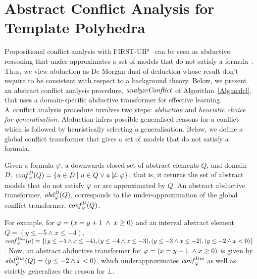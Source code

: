\section{Abstract Conflict Analysis for Template Polyhedra}\label{sec:conflict}
%
Propositional conflict analysis with FIRST-UIP~\cite{cdcl} can be seen as
abductive reasoning that under-approximates a set of models that do not
satisfy a formula~\cite{sas12,dhk2013-popl}.  Thus, we view abduction as 
De Morgan dual of deduction whose result don't require to be consistent with respect
to a background theory.  Below, we present an abstract
conflict analysis procedure, $\mathit{analyzeConflict}$ of
Algorithm~\ref{Alg:acdcl}, that uses a domain-specific abductive transformer
for effective learning.  A~conflict analysis procedure involves two steps:
{\em abduction} and {\em heuristic choice for generalisation}.  Abduction
infers possible generalised reasons for a conflict which is followed by
heuristically selecting a generalisation.  Below, we define a global 
conflict transformer that gives a set of models that do not satisfy a 
formula.  
\begin{definition}
  Given a formula $\varphi$, a downwards closed set of abstract elements $Q$,
  and domain $\mathit{D}$, $\mathit{conf}_{\varphi}^{\mathit{D}}(Q) = \{u \in \mathit{D} \mid u \in
  Q \vee u \not\models \varphi \}$, that is, it returns 
  the set of abstract models that do not satisfy $\varphi$ or are approximated by 
  $Q$.  An abstract abductive transformer, $\mathit{abd}_{\varphi}^{\mathit{D}}(Q)$, corresponds to 
  the under-approximation of the global conflict transformer,
  $\mathit{conf}_{\varphi}^{\mathit{D}}(Q)$.  
\end{definition}
%
%
For example, for $\varphi=(x=y+1\; \wedge\; x\geq 0)$ and an interval 
abstract element $Q=(y\leq-5 \wedge x \leq -4)$, 
$\mathit{conf}_{\varphi}^{\mathit{Itvs}}(a) = \{(y\leq-5 \land x \leq -4),\allowbreak
(y \leq -4 \land x \leq -3),\allowbreak
(y \leq -3 \land x \leq -2), (y \leq -2 \land x < 0)\}$.  
%
Now, an abstract abductive transformer for $\varphi=(x=y+1\; \wedge x \geq 0)$ 
is given by $\mathit{abd}_{\varphi}^{\mathit{Itvs}}(Q)=(y \leq -2 \land x < 0)$, 
which underapproximates $\mathit{conf}_{\varphi}^{\mathit{Itvs}}$ as well as 
strictly generalizes the reason for $\bot$. 
%


